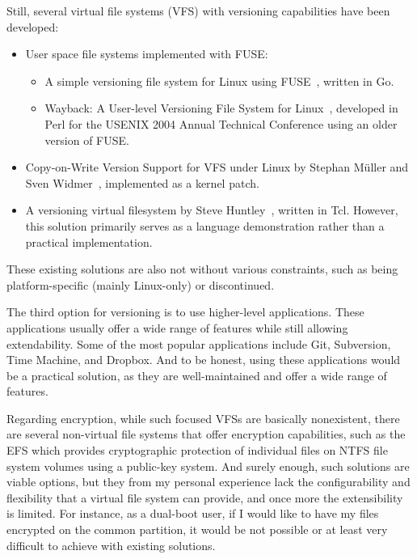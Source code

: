 Still, several virtual file systems (VFS) with versioning capabilities have been developed:

\begin{itemize}
    \item User space file systems implemented with FUSE:
    \begin{itemize}
        \item A simple versioning file system for Linux using FUSE~\cite{simple_vfs}, written in Go.
        \item Wayback: A User-level Versioning File System for Linux~\cite{wayback_vfs}, developed in Perl for the USENIX 2004 Annual Technical Conference using an older version of FUSE\@.
    \end{itemize}
    \item Copy-on-Write Version Support for VFS under Linux by Stephan Müller and Sven Widmer~\cite{vvfs}, implemented as a kernel patch.
    \item A versioning virtual filesystem by Steve Huntley~\cite{huntley_vvfs}, written in Tcl.
    However, this solution primarily serves as a language demonstration rather than a practical implementation.
\end{itemize}

These existing solutions are also not without various constraints, such as being platform-specific (mainly Linux-only) or discontinued.

The third option for versioning is to use higher-level applications.
These applications usually offer a wide range of features while still allowing extendability.
Some of the most popular applications include Git, Subversion, Time Machine, and Dropbox.
And to be honest, using these applications would be a practical solution, as they are well-maintained and offer a wide range of features.

Regarding encryption, while such focused VFSs are basically nonexistent, there are several non-virtual file systems that offer encryption capabilities, such as the EFS which provides cryptographic protection of individual files on NTFS file system volumes using a public-key system.
And surely enough, such solutions are viable options, but they from my personal experience lack the configurability and flexibility that a virtual file system can provide, and once more the extensibility is limited.
For instance, as a dual-boot user, if I would like to have my files encrypted on the common partition, it would be not possible or at least very difficult to achieve with existing solutions.

